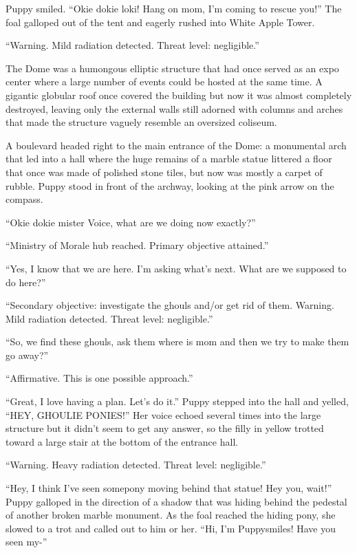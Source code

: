 Puppy smiled. ``Okie dokie loki! Hang on mom, I'm coming to rescue you!'' The foal galloped out of the tent and eagerly rushed into White Apple Tower.

\horizonline


``{\mt Warning. Mild radiation detected. Threat level: negligible.}''

The Dome was a humongous elliptic structure that had once served as an expo center where a large number of events could be hosted at the same time. A gigantic globular roof once covered the building but now it was almost completely destroyed, leaving only the external walls still adorned with columns and arches that made the structure vaguely resemble an oversized coliseum.

A boulevard headed right to the main entrance of the Dome: a monumental arch that led into a hall where the huge remains of a marble statue littered a floor that once was made of polished stone tiles, but now was mostly a carpet of rubble. Puppy stood in front of the archway, looking at the pink arrow on the compass.

``Okie dokie mister Voice, what are we doing now exactly?''

``{\mt Ministry of Morale hub reached. Primary objective attained.}''

``Yes, I know that we are here. I'm asking what's next. What are we supposed to do here?''

``Secondary objective: investigate the ghouls and/or get rid of them. Warning. Mild radiation detected. Threat level: negligible.''

``So, we find these ghouls, ask them where is mom and then we try to make them go away?''

``{\mt Affirmative. This is one possible approach.}''

``Great, I love having a plan. Let's do it.'' Puppy stepped into the hall and yelled, ``HEY, GHOULIE PONIES!'' Her voice echoed several times into the large structure but it didn't seem to get any answer, so the filly in yellow trotted toward a large stair at the bottom of the entrance hall.

``{\mt Warning. Heavy radiation detected. Threat level: negligible.}''

``Hey, I think I've seen somepony moving behind that statue! Hey you, wait!'' Puppy galloped in the direction of a shadow that was hiding behind the pedestal of another broken marble monument. As the foal reached the hiding pony, she slowed to a trot and called out to him or her. ``Hi, I'm Puppysmiles! Have you seen my-''

